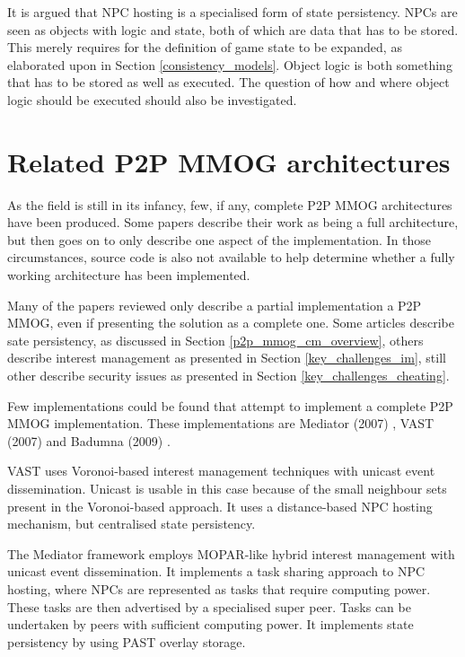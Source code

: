 \documentclass[journal,oneside,a4paper,onecolumn]{IEEEtran}
\begin{document}
It is argued that NPC hosting is a specialised form of state persistency. NPCs are seen as objects with logic and state, both of which are data that has to be stored. This merely requires for the definition of game state to be expanded, as elaborated upon in Section \ref{consistency_models}. Object logic is both something that has to be stored as well as executed. The question of how and where object logic should be executed should also be investigated.

\section{Related P2P MMOG architectures}
\label{related_architectures}

As the field is still in its infancy, few, if any, complete P2P MMOG architectures have been produced. Some papers describe their work as being a full architecture, but then goes on to only describe one aspect of the implementation. In those circumstances, source code is also not available to help determine whether a fully working architecture has been implemented.

Many of the papers reviewed only describe a partial implementation a P2P MMOG, even if presenting the solution as a complete one. Some articles describe sate persistency, as discussed in Section \ref{p2p_mmog_cm_overview}, others describe interest management as presented in Section \ref{key_challenges_im}, still other describe security issues as presented in Section \ref{key_challenges_cheating}.

Few implementations could be found that attempt to implement a complete P2P MMOG implementation. These implementations are Mediator (2007) \cite{Fan_phd}, VAST (2007) \cite{VON_VAST} and Badumna (2009) \cite{badumna_engine}.

VAST uses Voronoi-based interest management techniques with unicast event dissemination. Unicast is usable in this case because of the small neighbour sets present in the Voronoi-based approach. It uses a distance-based NPC hosting mechanism, but centralised state persistency.

The Mediator framework employs MOPAR-like hybrid interest management with unicast event dissemination. It implements a task sharing approach to NPC hosting, where NPCs are represented as tasks that require computing power. These tasks are then advertised by a specialised super peer. Tasks can be undertaken by peers with sufficient computing power. It implements state persistency by using PAST overlay storage.
\end{document}
